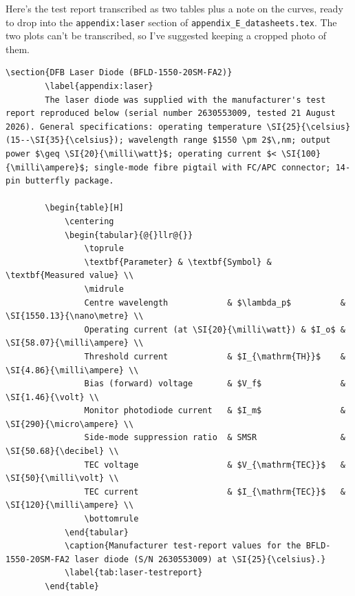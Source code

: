 \begin{tcolorbox}[breakable, colback=gray!4, colframe=gray!50,
	boxrule=0.4pt, arc=2pt, fontupper=\small,
	left=6pt, right=6pt, top=4pt, bottom=4pt]
	Here's the test report transcribed as two tables plus a note on the curves, ready to drop into the \texttt{appendix:laser} section of \texttt{appendix\_E\_datasheets.tex}. The two plots can't be transcribed, so I've suggested keeping a cropped photo of them.
	
	\begin{lstlisting}[style=airesponse]
		\section{DFB Laser Diode (BFLD-1550-20SM-FA2)}
		\label{appendix:laser}
		The laser diode was supplied with the manufacturer's test report reproduced below (serial number 2630553009, tested 21 August 2026). General specifications: operating temperature \SI{25}{\celsius} (15--\SI{35}{\celsius}); wavelength range $1550 \pm 2$\,nm; output power $\geq \SI{20}{\milli\watt}$; operating current $< \SI{100}{\milli\ampere}$; single-mode fibre pigtail with FC/APC connector; 14-pin butterfly package.
		
		\begin{table}[H]
			\centering
			\begin{tabular}{@{}llr@{}}
				\toprule
				\textbf{Parameter} & \textbf{Symbol} & \textbf{Measured value} \\
				\midrule
				Centre wavelength            & $\lambda_p$          & \SI{1550.13}{\nano\metre} \\
				Operating current (at \SI{20}{\milli\watt}) & $I_o$ & \SI{58.07}{\milli\ampere} \\
				Threshold current            & $I_{\mathrm{TH}}$    & \SI{4.86}{\milli\ampere} \\
				Bias (forward) voltage       & $V_f$                & \SI{1.46}{\volt} \\
				Monitor photodiode current   & $I_m$                & \SI{290}{\micro\ampere} \\
				Side-mode suppression ratio  & SMSR                 & \SI{50.68}{\decibel} \\
				TEC voltage                  & $V_{\mathrm{TEC}}$   & \SI{50}{\milli\volt} \\
				TEC current                  & $I_{\mathrm{TEC}}$   & \SI{120}{\milli\ampere} \\
				\bottomrule
			\end{tabular}
			\caption{Manufacturer test-report values for the BFLD-1550-20SM-FA2 laser diode (S/N 2630553009) at \SI{25}{\celsius}.}
			\label{tab:laser-testreport}
		\end{table}
		

\end{lstlisting}
\end{tcolorbox}
